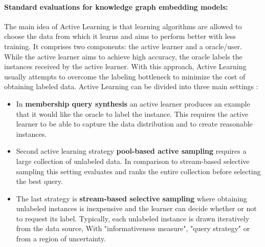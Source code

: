 \paragraph{\textbf{Standard evaluations for knowledge graph embedding models:}}
The main idea of Active Learning is that learning algorithms are allowed to choose the data from which it learns and aims to perform better with less training.
It comprises two components: the active learner and a oracle/user.
While the active learner aims to achieve high accuracy, the oracle labels the instances received by the active learner.
With this approach, Active Learning usually attempts to overcome the labeling bottleneck to minimize the cost of obtaining labeled data.
Active Learning can be divided into three main settings \cite{Settles2009ActiveLL}:
\begin{itemize}
    \item 
    In \textbf{membership query synthesis} an active learner produces an example that it would like the oracle to label the instance.
    This requires the active learner to be able to capture the data distribution and to create reasonable instances.
    
    \item 
    Second active learning strategy  \textbf{pool-based active sampling} requires a large collection of unlabeled data.
    In comparison to stream-based selective sampling this setting evaluates and ranks the entire collection before selecting the best query.
    
    \item 
    The last strategy is \textbf{stream-based selective sampling} where obtaining unlabeled instances is inexpensive and the learner can decide whether or not to request its label.
    Typically, each unlabeled instance is drawn iteratively from the data source,
    With "informativeness measure", "query strategy" or from a region of uncertainty.
    
\end{itemize}







